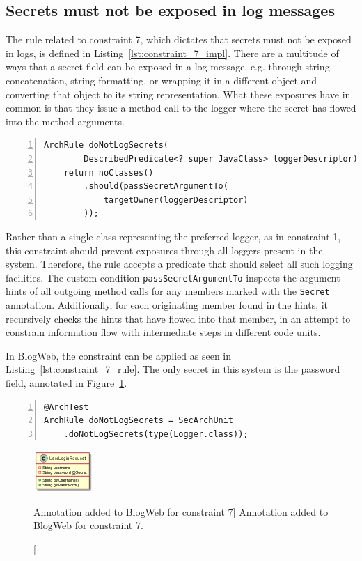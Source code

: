 \subsection{Secrets must not be exposed in log messages}
The rule related to constraint 7, which dictates that secrets must not be exposed in logs, is defined in Listing~\ref{lst:constraint_7_impl}.
There are a multitude of ways that a secret field can be exposed in a log message, e.g. through string concatenation, string formatting, or wrapping it in a different object and converting that object to its string representation. What these exposures have in common is that they issue a method call to the logger where the secret has flowed into the method arguments.

\begin{minipage}{\linewidth}
\begin{lstlisting}[caption={Rule definition for constraint 7.}, captionpos=b, label=lst:constraint_7_impl, numbers=left]
ArchRule doNotLogSecrets(
        DescribedPredicate<? super JavaClass> loggerDescriptor) {
    return noClasses()
        .should(passSecretArgumentTo(
            targetOwner(loggerDescriptor)
        ));
\end{lstlisting}
\end{minipage}

Rather than a single class representing the preferred logger, as in constraint 1, this constraint should prevent exposures through all loggers present in the system. Therefore, the rule accepts a predicate that should select all such logging facilities. The custom condition \texttt{passSecretArgumentTo} inspects the argument hints of all outgoing method calls for any members marked with the \texttt{Secret} annotation. Additionally, for each originating member found in the hints, it recursively checks the hints that have flowed into that member, in an attempt to constrain information flow with intermediate steps in different code units.

In BlogWeb, the constraint can be applied as seen in Listing~\ref{lst:constraint_7_rule}. The only secret in this system is the password field, annotated in Figure~\ref{fig:secrets_toy_system}.

\begin{minipage}{\linewidth}
\begin{lstlisting}[caption={Application of constraint 7 to BlogWeb.}, captionpos=b, label=lst:constraint_7_rule, numbers=left]
@ArchTest
ArchRule doNotLogSecrets = SecArchUnit
    .doNotLogSecrets(type(Logger.class));
\end{lstlisting}
\end{minipage}

\begin{figure}
    \centering
    \includegraphics[width=0.2\textwidth]{figure/toyexamples/Secrets.png}
    \caption
        [Annotation added to BlogWeb for constraint 7]
        {Annotation added to BlogWeb for constraint 7.}
    \label{fig:secrets_toy_system}
\end{figure}